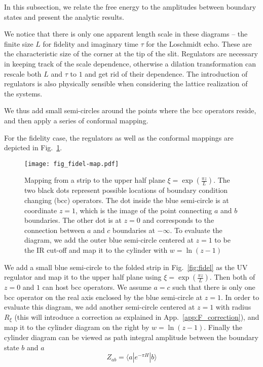 
In this subsection, we relate the free energy to the amplitudes between boundary states and present the analytic results. 

We notice that there is only one apparent length scale in these diagrams -- the finite size $L$ for fidelity and imaginary time $\tau$ for the Loschmidt echo. These are the characteristic size of the corner at the tip of the slit. Regulators are necessary in keeping track of the scale dependence, otherwise a dilation transformation can rescale both $L$ and $\tau$ to $1$ and get rid of their dependence. The introduction of regulators is also physically sensible when considering the lattice realization of the systems. 

We thus add small semi-circles around the points where the bcc operators reside, and then apply a series of conformal mapping. 

For the fidelity case, the regulators as well as the conformal mappings are depicted in Fig.~\ref{fig:fidel-map}. 
\begin{figure}[h]
\centering
\texttt{[image: fig\_fidel-map.pdf]}
\caption{Mapping from a strip to the upper half plane $\xi  = \exp( \frac{\pi z}{L} ) $. The two black dots represent possible locations of boundary condition changing (bcc) operators. The dot inside the blue semi-circle is at coordinate $z = 1$, which is the image of the point connecting $a$ and $b$ boundaries. The other dot is at $z = 0$ and corresponds to the connection between $a$ and $c$ boundaries at $- \infty$. To evaluate the diagram, we add the outer blue semi-circle centered at $z = 1$ to be the IR cut-off and map it to the cylinder with $w = \ln(z - 1)$}
\label{fig:fidel-map}
\end{figure}
We add a small blue semi-circle to the folded strip in Fig.~\ref{fig:fidel} as the UV regulator and map it to the upper half plane using $\xi  = \exp( \frac{\pi z}{L} )$. Then both of $z = 0$ and $1$ can host bcc operators. We assume $a = c$ such that there is only one bcc operator on the real axis enclosed by the blue semi-circle at $z = 1$. In order to evaluate this diagram, we add another semi-circle centered at $z = 1$ with radius $R_{\xi}$ (this will introduce a correction as explained in App.~\ref{app:F_correction}), and map it to the cylinder diagram on the right by $w = \ln ( z- 1)$. Finally the cylinder diagram can be viewed as path integral amplitude between the boundary state $b$ and $a$
\begin{equation}
Z_{ab} = \langle a | e^{-\pi H } |b \rangle
\end{equation}

